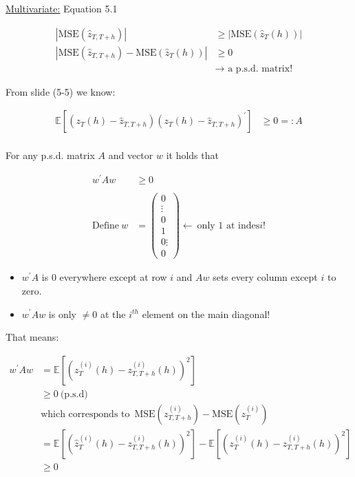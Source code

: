 \documentclass[12pt,a4paper]{article}
\begin{document}
\underline{Multivariate:} Equation 5.1

\begin{align*}
  \left| \text{MSE} \left( \hat{z}_{T, T+h} \right) \right| & \geq \left| \text{MSE} \left( \hat{z}_{T} (h) \right) \right| \\
  \left| \text{MSE} \left( \hat{z}_{T, T+h} \right) - \text{MSE} \left( \hat{z}_{T} (h) \right) \right| & \geq 0 \\
  & \text{$\rightarrow$ a p.s.d. matrix! }
\end{align*}

From slide (5-5) we know:

\begin{align*}
  \mathbb{E} \left[ \left( z_T (h) - \hat{z}_{T, T+h}\right) \left( z_T (h) - \hat{z}_{T, T+h}\right)^{'} \right] & \geq 0 =: A\\
\end{align*}

For any p.s.d. matrix \(A\) and vector \(w\) it holds that

\begin{align*}
  w^{'} A w & \geq 0 \\
  \\
  \text{Define} \ w & = \begin{pmatrix} 0 \\ \vdots \\ 0 \\ 1 \\ 0 \vdots \\ 0 \end{pmatrix} \leftarrow \ \text{only 1 at indes} i \text{!}
\end{align*}

\begin{itemize}
  \item $w^{'} A$ is $0$ everywhere except at row $i$ and $Aw$ sets every column except $i$ to zero. 
  \item $w^{'}A w$ is only $\neq 0$ at the $i^{th}$ element on the main diagonal!
\end{itemize}

That means:

\begin{align*}
  w^{'} A w & = \mathbb{E} \left[ \left( z_T^{(i)} (h) - z_{T, T+h}^{(i)} (h) \right)^2 \right]\\
  & \geq 0 \ \text{(p.s.d)}\\
  & \text{which corresponds to} \ \; \text{MSE} \left(z_{T, T+h}^{(i)} \right) - \text{MSE} \left(z_{T}^{(i)} \right)\\
  & = \mathbb{E} \left[ \left( \hat{z}_T^{(i)} (h) - z_{T, T+h}^{(i)} (h) \right)^2 \right] - \mathbb{E} \left[ \left( z_T^{(i)} (h) - z_{T, T+h}^{(i)} (h) \right)^2 \right] \\
  & \geq 0
\end{align*}
\end{document}

